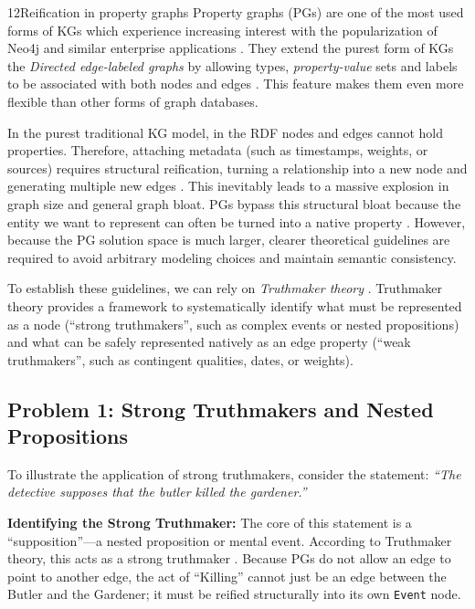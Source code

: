 \begin{question}{1}{2}{Reification in property graphs}
Property graphs (PGs) \cite{angles_property_2018} are one of the most used forms of KGs which experience increasing interest with the popularization of Neo4j \cite{miller_graph_2013} and similar enterprise applications \cite{angles_foundations_2017}. They extend the purest form of KGs the \textit{Directed edge-labeled graphs} by allowing types, \textit{property-value} sets and labels to be associated with both nodes and edges \cite{hogan_knowledge_2022}. This feature makes them even more flexible than other forms of graph databases.

In the purest traditional KG model, in the RDF \cite{cyganiak_rdf_2014} nodes and edges cannot hold properties. Therefore, attaching metadata (such as timestamps, weights, or sources) requires structural reification, turning a relationship into a new node and generating multiple new edges \cite{hernandez_reifying_nodate}. This inevitably leads to a massive explosion in graph size and general graph bloat. PGs bypass this structural bloat because the entity we want to represent can often be turned into a native property \cite{angles_rdf_nodate}. However, because the PG solution space is much larger, clearer theoretical guidelines are required to avoid arbitrary modeling choices and maintain semantic consistency.

To establish these guidelines, we can rely on \textit{Truthmaker theory} \cite{guarino_reification_2018}. Truthmaker theory provides a framework to systematically identify what must be represented as a node (``strong truthmakers'', such as complex events or nested propositions) and what can be safely represented natively as an edge property (``weak truthmakers'', such as contingent qualities, dates, or weights). 

\subsection{Problem 1: Strong Truthmakers and Nested Propositions}

To illustrate the application of strong truthmakers, consider the statement: \textit{``The detective supposes that the butler killed the gardener.''}

\textbf{Identifying the Strong Truthmaker:} The core of this statement is a ``supposition''—a nested proposition or mental event. According to Truthmaker theory, this acts as a strong truthmaker \cite{guarino_reification_2018}. Because PGs do not allow an edge to point to another edge, the act of ``Killing'' cannot just be an edge between the Butler and the Gardener; it must be reified structurally into its own \texttt{Event} node. 


\end{question}
